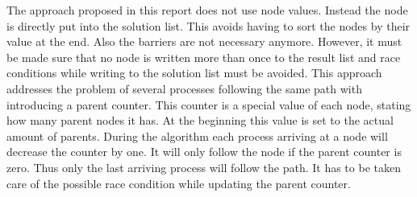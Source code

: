 The approach proposed in this report does not use node values. Instead the node is directly put into the solution list. This avoids having to sort the nodes by their value at the end. Also the barriers are not necessary anymore. However, it must be made sure that no node is written more than once to the result list and race conditions while writing to the solution list must be avoided. This approach addresses the problem of several processes following the same path with introducing a parent counter. This counter is a special value of each node, stating how many parent nodes it has. At the beginning this value is set to the actual amount of parents. During the algorithm each process arriving at a node will decrease the counter by one. It will only follow the node if the parent counter is zero. Thus only the last arriving process will follow the path. It has to be taken care of the possible race condition while updating the parent counter.



 
 
